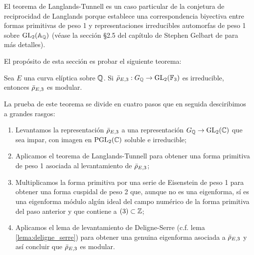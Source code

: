 El teorema de Langlands-Tunnell es un caso particular de la conjetura de reciprocidad de Langlands porque establece una correspondencia biyectiva entre formas primitivas de peso 1 y representaciones irreducibles automorfas de peso 1 sobre $\mathrm{GL}_2(\mathbb{A}_{\mathbb{Q}})$ (v\'ease la secci\'on \S2.5  del cap\'itulo de Stephen Gelbart de \cite{GelbartTL} para m\'as detalles).

El prop\'osito de esta secci\'on es probar el siguiente teorema:

\begin{thm}\label{thm:modularidad_rhot}
  Sea $E$ una curva el\'iptica sobre $\mathbb{Q}$. Si $\bar{\rho}_{E,3}:G_{\mathbb{Q}}\rightarrow \mathrm{GL}_2(\mathbb{F}_3)$ es irreducible, entonces $\bar{\rho}_{E,3}$ es modular.
\end{thm}

La prueba de este teorema se divide en cuatro pasos que en seguida desciribimos a grandes rasgos:
\begin{enumerate}
\item Levantamos la representaci\'on $\bar{\rho}_{E,3}$ a una representaci\'on $G_{\mathbb{Q}}\rightarrow\mathrm{GL}_2(\mathbb{C})$ que sea impar, con imagen en $\mathrm{PGL}_2(\mathbb{C})$ soluble e irreducible;
\item Aplicamos el teorema de Langlands-Tunnell para obtener una forma primitiva de peso 1 asociada al levantamiento de $\bar{\rho}_{E,3}$;
\item Multiplicamos la forma primitiva por una serie de Eisenstein de peso 1 para obtener una forma cuspidal de peso 2 que, aunque no es una eigenforma, s\'i es una eigenforma m\'odulo alg\'un ideal del campo num\'erico de la forma primitiva del paso anterior y que contiene a $(3)\subset\mathbb{Z}$;  
\item Aplicamos el lema de levantamiento de Deligne-Serre (c.f. lema \ref{lema:deligne_serre}) para obtener una genuina eigenforma asociada a $\bar{\rho}_{E,3}$ y as\'i concluir que $\bar{\rho}_{E,3}$ es modular.
\end{enumerate}

